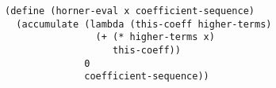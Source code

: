 \documentclass[a4paper,12pt]{article}
\begin{document}
\begin{lstlisting}
(define (horner-eval x coefficient-sequence)
  (accumulate (lambda (this-coeff higher-terms)
                (+ (* higher-terms x)
                   this-coeff))
              0
              coefficient-sequence))
\end{lstlisting}
\end{document}
